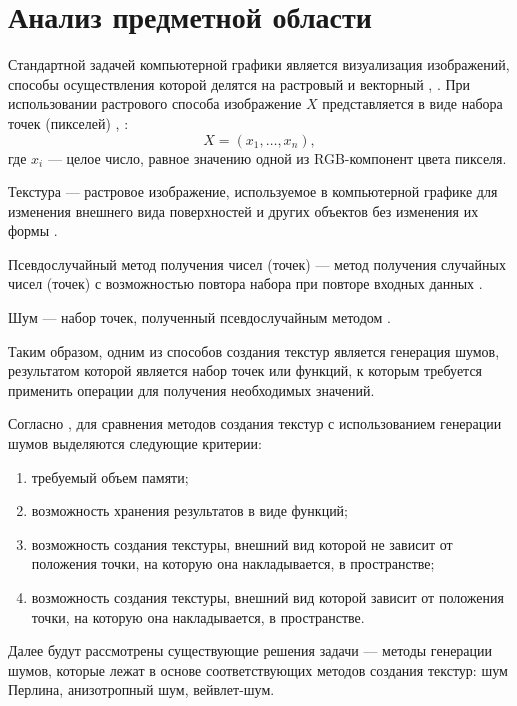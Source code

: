 \chapter{Анализ предметной области}


Стандартной задачей компьютерной графики является визуализация изображений, способы осуществления которой делятся на растровый и векторный \cite{Porev}, \cite{boreskov}.
При использовании растрового способа изображение $X$ представляется в виде набора точек (пикселей) \cite{Porev}, \cite{boreskov}:
\begin{equation}\label{eq:image_x}
	X=(x_1,\dots,x_n),
\end{equation}
где $x_i$ --- целое число, равное значению одной из RGB-компонент цвета пикселя.

Текстура --- растровое изображение, используемое в компьютерной графике для изменения внешнего вида поверхностей и других объектов без изменения их формы \cite{smorkalov}.

Псевдослучайный метод получения чисел (точек) --- метод получения случайных чисел (точек) с возможностью повтора набора при повторе входных данных \cite{мухамеджанов2018генератор}.

Шум --- набор точек, полученный псевдослучайным методом \cite{petrova2022}.

Таким образом, одним из способов создания текстур является генерация шумов, результатом которой является набор точек или функций, к которым требуется применить операции для получения необходимых значений.

Согласно \cite{survey}, для сравнения методов создания текстур с использованием генерации шумов выделяются следующие критерии:
\begin{enumerate}
	\item требуемый объем памяти;
	\item возможность хранения результатов в виде функций;
	\item возможность создания текстуры, внешний вид которой не зависит от положения точки, на которую она накладывается, в пространстве;
	\item возможность создания текстуры, внешний вид которой зависит от положения точки, на которую она накладывается, в пространстве.
\end{enumerate}

Далее будут рассмотрены существующие решения задачи --- методы генерации шумов, которые лежат в основе соответствующих методов создания текстур: шум Перлина, анизотропный шум, вейвлет-шум.